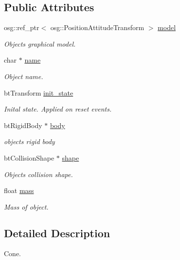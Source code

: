 \subsection*{Public Attributes}
\begin{DoxyCompactItemize}
\item 
osg\+::ref\+\_\+ptr$<$ osg\+::\+Position\+Attitude\+Transform $>$ \hyperlink{classbtosgObject_afd15726e7a214212d6d5815f8ac1ac6c}{model}
\begin{DoxyCompactList}\small\item\em Object\textquotesingle{}s graphical model. \end{DoxyCompactList}\item 
char $\ast$ \hyperlink{classbtosgObject_a12396e1362797a75473a2e833b579cc9}{name}
\begin{DoxyCompactList}\small\item\em Object name. \end{DoxyCompactList}\item 
bt\+Transform \hyperlink{classbtosgObject_a2dee023f311114e200df9b04c8c1b400}{init\+\_\+state}
\begin{DoxyCompactList}\small\item\em Inital state. Applied on reset events. \end{DoxyCompactList}\item 
bt\+Rigid\+Body $\ast$ \hyperlink{classbtosgObject_a64ccde0543c184ed1749fdb9c9699785}{body}
\begin{DoxyCompactList}\small\item\em object\textquotesingle{}s rigid body \end{DoxyCompactList}\item 
bt\+Collision\+Shape $\ast$ \hyperlink{classbtosgObject_a0f6a8da01cf643c321bffe86e42604b0}{shape}
\begin{DoxyCompactList}\small\item\em Object\textquotesingle{}s collision shape. \end{DoxyCompactList}\item 
float \hyperlink{classbtosgObject_a2418bb2194d5e9b0f1c51c84672ba7d1}{mass}
\begin{DoxyCompactList}\small\item\em Mass of object. \end{DoxyCompactList}\end{DoxyCompactItemize}


\subsection{Detailed Description}
Cone. 

